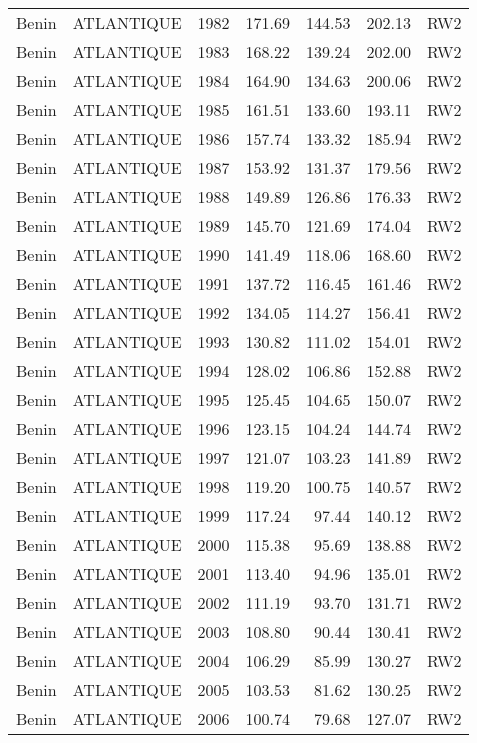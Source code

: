 \begin{longtable}{lllrrrl}
  Benin & ATLANTIQUE & 1982 & 171.69 & 144.53 & 202.13 & RW2 \\ 
  Benin & ATLANTIQUE & 1983 & 168.22 & 139.24 & 202.00 & RW2 \\ 
  Benin & ATLANTIQUE & 1984 & 164.90 & 134.63 & 200.06 & RW2 \\ 
  Benin & ATLANTIQUE & 1985 & 161.51 & 133.60 & 193.11 & RW2 \\ 
  Benin & ATLANTIQUE & 1986 & 157.74 & 133.32 & 185.94 & RW2 \\ 
  Benin & ATLANTIQUE & 1987 & 153.92 & 131.37 & 179.56 & RW2 \\ 
  Benin & ATLANTIQUE & 1988 & 149.89 & 126.86 & 176.33 & RW2 \\ 
  Benin & ATLANTIQUE & 1989 & 145.70 & 121.69 & 174.04 & RW2 \\ 
  Benin & ATLANTIQUE & 1990 & 141.49 & 118.06 & 168.60 & RW2 \\ 
  Benin & ATLANTIQUE & 1991 & 137.72 & 116.45 & 161.46 & RW2 \\ 
  Benin & ATLANTIQUE & 1992 & 134.05 & 114.27 & 156.41 & RW2 \\ 
  Benin & ATLANTIQUE & 1993 & 130.82 & 111.02 & 154.01 & RW2 \\ 
  Benin & ATLANTIQUE & 1994 & 128.02 & 106.86 & 152.88 & RW2 \\ 
  Benin & ATLANTIQUE & 1995 & 125.45 & 104.65 & 150.07 & RW2 \\ 
  Benin & ATLANTIQUE & 1996 & 123.15 & 104.24 & 144.74 & RW2 \\ 
  Benin & ATLANTIQUE & 1997 & 121.07 & 103.23 & 141.89 & RW2 \\ 
  Benin & ATLANTIQUE & 1998 & 119.20 & 100.75 & 140.57 & RW2 \\ 
  Benin & ATLANTIQUE & 1999 & 117.24 & 97.44 & 140.12 & RW2 \\ 
  Benin & ATLANTIQUE & 2000 & 115.38 & 95.69 & 138.88 & RW2 \\ 
  Benin & ATLANTIQUE & 2001 & 113.40 & 94.96 & 135.01 & RW2 \\ 
  Benin & ATLANTIQUE & 2002 & 111.19 & 93.70 & 131.71 & RW2 \\ 
  Benin & ATLANTIQUE & 2003 & 108.80 & 90.44 & 130.41 & RW2 \\ 
  Benin & ATLANTIQUE & 2004 & 106.29 & 85.99 & 130.27 & RW2 \\ 
  Benin & ATLANTIQUE & 2005 & 103.53 & 81.62 & 130.25 & RW2 \\ 
  Benin & ATLANTIQUE & 2006 & 100.74 & 79.68 & 127.07 & RW2 \\ 

\end{longtable}
